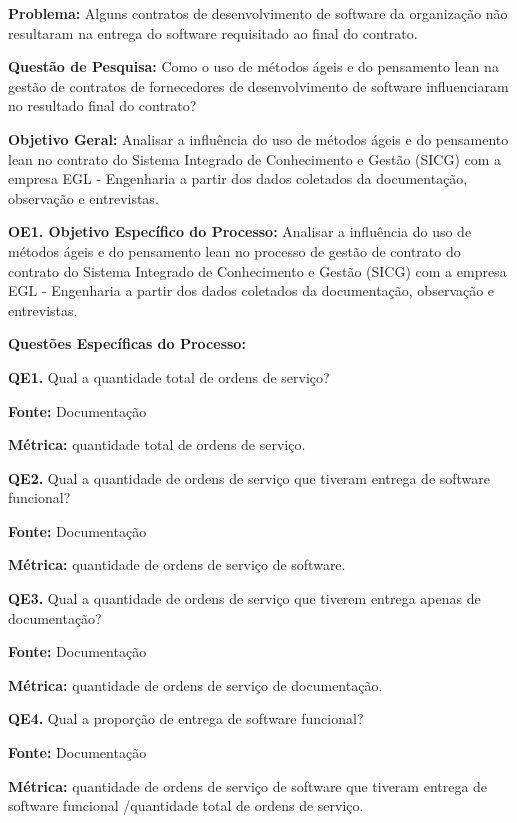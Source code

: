 \textbf{Problema:} Alguns contratos de desenvolvimento de software da organização não resultaram na entrega do software requisitado ao final do contrato.

\textbf{Questão de Pesquisa:} Como o uso de métodos ágeis e do pensamento lean na gestão de contratos de fornecedores de desenvolvimento de software influenciaram no resultado final do contrato?

\textbf{Objetivo Geral:} Analisar a influência do uso de métodos ágeis e do pensamento lean no contrato do Sistema Integrado de Conhecimento e Gestão (SICG) com a empresa EGL - Engenharia a partir dos dados coletados da documentação, observação e entrevistas.

\textbf{OE1. Objetivo Específico do Processo:} Analisar a influência do uso de métodos ágeis e do pensamento lean no processo de gestão de contrato do contrato do Sistema Integrado de Conhecimento e Gestão (SICG) com a empresa EGL - Engenharia a partir dos dados coletados da documentação, observação e entrevistas.

\textbf{Questões Específicas do Processo:}


\textbf{QE1.}  Qual a quantidade total de ordens de serviço?

\textbf{Fonte:} Documentação

\textbf{Métrica:} quantidade total de ordens de serviço.
 
\vspace{\onelineskip} 

\textbf{QE2.} Qual a quantidade de ordens de serviço que tiveram entrega de software funcional?

\textbf{Fonte:} Documentação

\textbf{Métrica:} quantidade de ordens de serviço de software.
 
 \vspace{\onelineskip} 

\textbf{QE3.} Qual a quantidade de ordens de serviço que tiverem entrega apenas de documentação?

\textbf{Fonte:} Documentação

\textbf{Métrica:} quantidade de ordens de serviço de documentação.

 \vspace{\onelineskip} 
 
\textbf{QE4.} Qual a proporção de entrega de software funcional?

\textbf{Fonte:} Documentação

\textbf{Métrica:} quantidade de ordens de serviço de software que tiveram entrega de software funcional /quantidade total de ordens de serviço.

